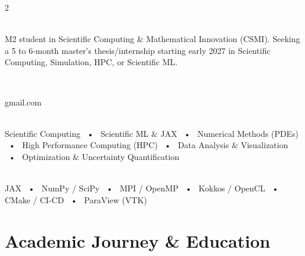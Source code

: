 \documentclass[lighthipster]{simplehipstercv}
\begin{document}
\begin{paracol}{2}

\paracolbackgroundoptions

\footnotesize
{\setasidefontcolour
\flushright
\begin{center}
\end{center}

\\[0.5em]

{\footnotesize M2 student in Scientific Computing \& Mathematical Innovation (CSMI). Seeking a 5 to 6-month master's thesis/internship starting early 2027 in Scientific Computing, Simulation, HPC, or Scientific ML.}
\bigskip

 \\[0.5em]



gmail.com


\bigskip

 \\[0.5em]

Scientific Computing ~•~ Scientific ML \& JAX ~•~ Numerical Methods (PDEs) ~•~ High Performance Computing (HPC) ~•~ Data Analysis \& Visualization ~•~ Optimization \& Uncertainty Quantification

\bigskip

 \\[0.5em]

JAX ~•~ NumPy / SciPy ~•~ MPI / OpenMP ~•~ Kokkos / OpenCL ~•~ CMake / CI-CD ~•~ ParaView (VTK)
}
\switchcolumn

\small
\section*{Academic Journey \& Education}


\end{paracol}
\end{document}
